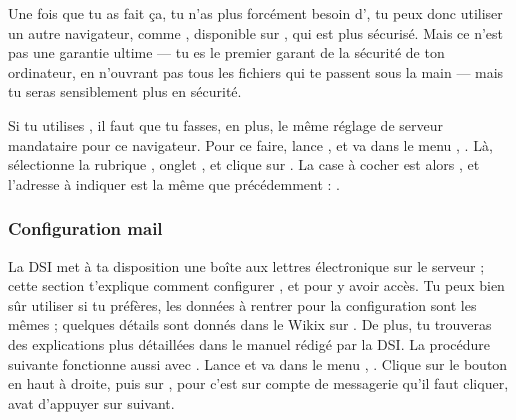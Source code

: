 Une fois que tu as fait \c{c}a, tu n'as plus forcément besoin d', tu peux donc utiliser un autre navigateur, comme , disponible sur \xshare, qui est plus sécurisé. Mais ce n'est pas une garantie ultime --- tu es le premier garant de la sécurité de ton
ordinateur, en n'ouvrant pas tous les fichiers qui te passent sous la main
--- mais tu seras sensiblement plus en sécurité.


Si tu utilises , il faut que tu fasses, en plus, le même réglage de serveur mandataire pour
ce navigateur. Pour ce faire, lance , et va dans le menu ,
. Là, sélectionne la rubrique , onglet , et clique sur
. La case à cocher est alors ,
et l'adresse à indiquer est la même que précédemment : .





\subsubsection{Configuration mail}

La DSI met à ta disposition une bo\^{i}te aux lettres électronique sur
le serveur  ; cette section t'explique comment
configurer , et  pour y avoir accès. Tu peux bien
s\^{u}r utiliser  si tu préfères, les données à rentrer
pour la configuration sont les mêmes ; quelques détails sont donnés
dans le Wikix sur \fkz. De plus, tu trouveras des explications plus
détaillées dans le manuel rédigé par la DSI.
La procédure suivante fonctionne aussi avec .
Lance  et va dans le menu ,
. Clique sur le bouton  en
haut à droite, puis sur , pour  c'est sur compte de messagerie qu'il faut cliquer, avat d'appuyer sur suivant.



